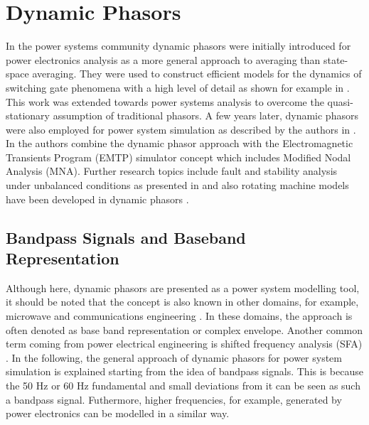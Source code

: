 \chapter{Dynamic Phasors}
In the power systems community dynamic phasors were initially introduced for power electronics analysis \cite{sanders1991generalized} as a more general approach to averaging than state-space averaging. 
They were used to construct efficient models for the dynamics of switching gate phenomena with a high level of detail as shown for example in \cite{mattavelli1999ssr}\cite{stefanov2002modeling}. 
This work was extended towards power systems analysis \cite{venkatasubramanian1995fast} to overcome the quasi-stationary assumption of traditional phasors. 
A few years later, dynamic phasors were also employed for power system simulation as described by the authors in \cite{strunz2006frequency}\cite{demiray2008evaluation}. 
In \cite{strunz2006frequency} the authors combine the dynamic phasor approach with the Electromagnetic Transients Program (EMTP) simulator concept which includes Modified Nodal Analysis (MNA).  
Further research topics include fault and stability analysis under unbalanced conditions as presented in \cite{stankovic2000analysis} and also rotating machine models have been developed in dynamic phasors \cite{stankovic2002dynamic}\cite{zhang2007synchronous}. 

\section{Bandpass Signals and Baseband Representation}
Although here, dynamic phasors are presented as a power system modelling tool, it should be noted that the concept is also known in other domains, for example, microwave and communications engineering \cite{maas2003nonlinear}\cite{suarez2009analysis}\cite{haykin2009communication}\cite{proakis2001communication}. 
In these domains, the approach is often denoted as base band representation or complex envelope. 
Another common term coming from power electrical engineering is shifted frequency analysis (SFA) \cite{strunz2006frequency}. 
In the following, the general approach of dynamic phasors for power system simulation is explained starting from the idea of bandpass signals. This is because the 50 Hz or 60 Hz fundamental and small deviations from it can be seen as such a bandpass signal. 
Futhermore, higher frequencies, for example, generated by power electronics can be modelled in a similar way.

